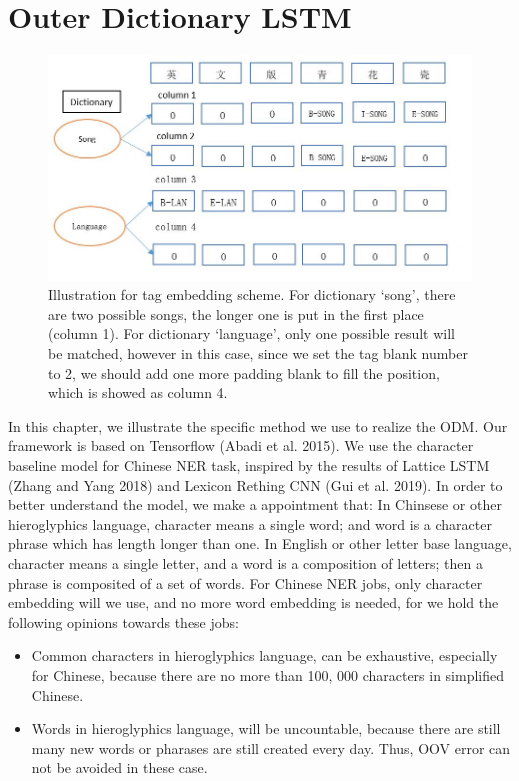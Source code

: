 \documentclass[letterpaper]{article} %
\begin{document}
\section{Outer Dictionary LSTM}


\begin{figure}[t]
\centering
\includegraphics[width=0.9\columnwidth]{tag_scheme} %
\caption{Illustration for tag embedding scheme. For dictionary `song', there are two possible songs, the longer one is put in the first place (column 1). For dictionary `language', only one possible result will be matched, however in this case, since we set the tag blank number to 2, we should add one more padding blank to fill the position, which is showed as column 4. }
\label{tag_scheme}
\end{figure}

In this chapter, we illustrate the specific method we use to realize the ODM. Our framework is based on Tensorflow (Abadi et al. 2015). We use the character baseline model for Chinese NER task,  inspired by the results of Lattice LSTM (Zhang and Yang 2018) and Lexicon Rething CNN (Gui et al. 2019). In order to better understand the model, we make a appointment that: In Chinsese or other hieroglyphics language, character means a single word; and word is a character phrase which has length longer than one. In English or other letter base language, character means a single letter, and a word is a composition of letters; then a phrase is composited of a set of words. For Chinese NER jobs, only character embedding will we use, and no more word embedding is needed, for we hold the following opinions towards these jobs:

\begin{itemize}
\item Common characters in hieroglyphics language, can be exhaustive,  especially for Chinese, because there are no more than 100, 000 characters in simplified Chinese. 
\item Words in hieroglyphics language, will be uncountable, because there are still many new words or pharases are still created every day. Thus, OOV error can not be avoided in these case.
\end{itemize}
\end{document}
